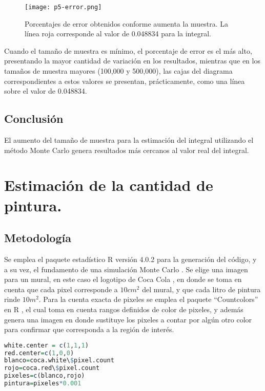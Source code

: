 \documentclass{article}
\begin{document}
\begin{figure}[ptb]
\begin{center}
\texttt{[image: p5-error.png]}
\end{center}
\caption{Porcentajes de error obtenidos conforme aumenta la muestra. La línea roja corresponde al valor de 0.048834 para la integral.\label{error}}
\end{figure}
Cuando el tamaño de muestra es mínimo, el porcentaje de error es el más alto, presentando la mayor cantidad de variación en los resultados, mientras que en los tamaños de muestra mayores (100,000 y 500,000), las cajas del diagrama correspondientes a estos valores se presentan, prácticamente, como una línea sobre el valor de 0.048834.

\subsection{Conclusión}
El aumento del tamaño de muestra para la estimación del integral utilizando el método Monte Carlo genera resultados más cercanos al valor real del integral.




\section{Estimación de la cantidad de pintura.}
\subsection{Metodología}
Se emplea el paquete estadístico R versión 4.0.2 \cite{R} para la generación del código, y a su vez, el fundamento de una simulación Monte Carlo \cite{mc}. Se elige una imagen para un mural, en este caso el logotipo de Coca Cola \cite{cc}, en donde se toma en cuenta que cada pixel corresponde a $10cm^{2}$ del mural, y que cada litro de pintura rinde $10m^{2}$. Para la cuenta exacta de pixeles se emplea el paquete ``Countcolors'' en R \cite{color}, el cual toma en cuenta rangos definidos de color de pixeles, y además genera una imagen en donde sustituye los pixeles a contar por algún otro color para confirmar que corresponda a la región de interés.
\begin{lstlisting}[language=R]
white.center = c(1,1,1) 
red.center=c(1,0,0)
blanco=coca.white\$pixel.count
rojo=coca.red\$pixel.count
pixeles=c(blanco,rojo)
pintura=pixeles*0.001 
\end{lstlisting}
\end{document}
